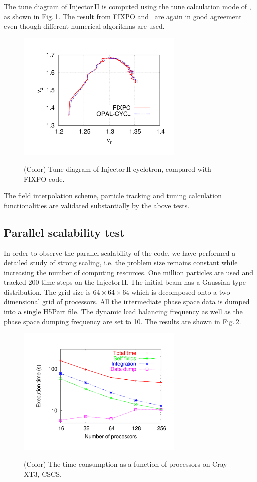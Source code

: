 \documentclass[aps,prstab,onecolumn,superscriptaddress,showpacs]{revtex4}
\begin{document}
The tune diagram of Injector\,II is computed using the tune calculation mode of \opalcycl, as shown in Fig.\,\ref{fig:nurnuz_Inj2}.
The result from FIXPO and \opalcycl \ are again in good agreement even though different numerical algorithms are used.%
\begin{figure}
  {\includegraphics[width=8cm,trim=2.5cm 2.5cm 2.5cm 2.5cm]{figures/nurnuz_Inj2.pdf}}
  \caption{(Color) Tune diagram of Injector\,II cyclotron, compared with FIXPO code.}
  \label{fig:nurnuz_Inj2}
\end{figure}

The field interpolation scheme, particle tracking and tuning calculation functionalities are validated substantially by the above tests. 
\subsection{Parallel scalability test}
In order to observe the parallel scalability of the code, we have performed a detailed study of strong scaling, i.e. the problem size remains constant while increasing the number of 
computing resources.
One million particles are used and tracked 200 time steps on the Injector\,II. The initial beam has a Gaussian
type distribution. The grid size is $64 \times 64 \times 64$ which is decomposed onto a two dimensional grid of processors. All the intermediate phase space data is dumped into 
a single H5Part file. The dynamic load balancing frequency as well as the phase space dumping frequency are set to 10.
The results are shown in Fig.\,\ref{scalability}.
\begin{figure}
  {\includegraphics[width=8cm,trim=0cm 0cm 0cm 0cm]{figures/Timing64mesh.pdf}}
  \caption{(Color) The time consumption as a function of processors on Cray XT3, CSCS.}
  \label{scalability}
\end{figure}
\end{document}
